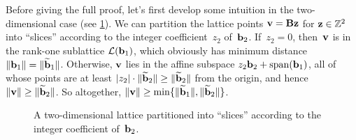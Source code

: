 \documentclass[11pt]{article}
\begin{document}
Before giving the full proof, let's first develop some intuition in
the two-dimensional case (see \cref{fig:lambdaSlices}). We can
partition the lattice points $\mathbf{v} = \mathbf{B} \mathbf{z}$ for
$\mathbf{z} \in \mathbb{Z}^{2}$ into ``slices'' according to the integer
coefficient~$z_{2}$ of~$\mathbf{b}_{2}$. If~$z_{2} = 0$, then~$\mathbf{v}$ is in
the rank-one sublattice $\mathcal{L}(\mathbf{b}_{1})$, which obviously has minimum
distance $\lVert\mathbf{b}_{1}\rVert = \lVert\widetilde{\mathbf{b}}_{1}\rVert$. Otherwise,
$\mathbf{v}$ lies in the affine subspace
$z_{2} \mathbf{b}_{2} + \operatorname{span}(\mathbf{b}_{1})$, all of whose points are at least
$\lvert z_{2}\rvert \cdot \lVert\widetilde{\mathbf{b}}_{2}\rVert \geq
\lVert\widetilde{\mathbf{b}}_{2}\rVert$ from the origin, and hence
$\lVert\mathbf{v}\rVert \geq \lVert\widetilde{\mathbf{b}}_{2}\rVert$. So altogether,
$\lVert\mathbf{v}\rVert \geq \min \{\lVert\widetilde{\mathbf{b}}_{1}\rVert,
  \lVert\widetilde{\mathbf{b}}_{2}\rVert\}$.

\begin{figure}[h!]
  \centering
  \caption{A two-dimensional lattice partitioned into ``slices''
    according to the integer coefficient of~$\mathbf{b}_{2}$.}
  \label{fig:lambdaSlices}
\end{figure}
\end{document}
